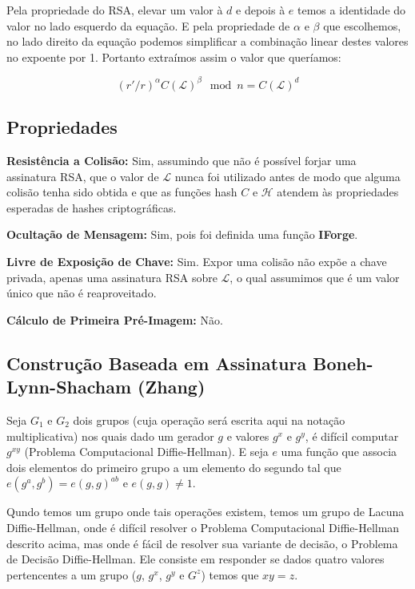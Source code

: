 \documentclass[a4paper]{article}
\begin{document}
Pela propriedade do RSA, elevar um valor à $d$ e depois à $e$ temos a
identidade do valor no lado esquerdo da equação. E pela propriedade de
$\alpha$ e $\beta$ que escolhemos, no lado direito da equação podemos
simplificar a combinação linear destes valores no expoente por
1. Portanto extraímos assim o valor que queríamos:

$$
(r'/r)^\alpha C(\mathcal{L})^{\beta} \mod n= C(\mathcal{L})^d
$$

\subsection{Propriedades}

\textbf{Resistência a Colisão: }Sim, assumindo que não é possível
forjar uma assinatura RSA, que o valor de $\mathcal{L}$ nunca foi
utilizado antes de modo que alguma colisão tenha sido obtida e que as
funções hash $C$ e $\mathcal{H}$ atendem às propriedades esperadas de
hashes criptográficas.

\textbf{Ocultação de Mensagem: }Sim, pois foi definida uma função
\textbf{IForge}.

\textbf{Livre de Exposição de Chave: } Sim. Expor uma colisão não
expõe a chave privada, apenas uma assinatura RSA sobre $\mathcal{L}$,
o qual assumimos que é um valor único que não é reaproveitado.
  
\textbf{Cálculo de Primeira Pré-Imagem: }Não.

\subsection{Construção Baseada em Assinatura Boneh-Lynn-Shacham (Zhang) \cite{zhang}}

Seja $G_1$ e $G_2$ dois grupos (cuja operação será escrita aqui na
notação multiplicativa) nos quais dado um gerador $g$ e valores $g^x$
e $g^y$, é difícil computar $g^{xy}$ (Problema Computacional
Diffie-Hellman). E seja $e$ uma função que associa dois elementos do
primeiro grupo a um elemento do segundo tal que $e(g^a, g^b) = e(g,
g)^{ab}$ e $e(g, g) \neq 1$.

Qundo temos um grupo onde tais operações existem, temos um grupo de
Lacuna Diffie-Hellman, onde é difícil resolver o Problema
Computacional Diffie-Hellman descrito acima, mas onde é fácil de
resolver sua variante de decisão, o Problema de Decisão
Diffie-Hellman. Ele consiste em responder se dados quatro valores
pertencentes a um grupo ($g$, $g^x$, $g^y$ e $G^z$) temos que $xy=z$.
\end{document}
